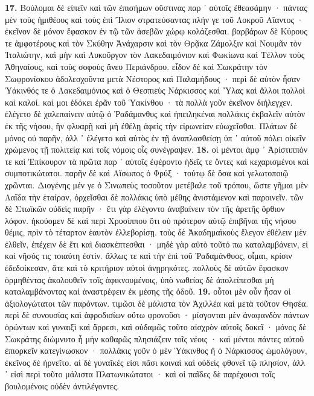 \documentclass[a4paper, 11pt, oneside, polutonikogreek, german]{article}
\begin{document}
\textbf{17.} Βούλομαι δὲ εἰπεῖν καὶ τῶν ἐπισήμων οὕστινας παρ ᾽ αὐτοῖς ἐθεασάμην · πάντας μὲν τοὺς ἡμιθέους καὶ τοὺς ἐπὶ Ἴλιον στρατεύσαντας πλήν γε τοῦ Λοκροῦ Αἴαντος · ἐκεῖνον δὲ μόνον ἔφασκον ἐν τῷ τῶν ἀσεβῶν χώρῳ κολάζεσθαι. βαρβάρων δὲ Κύρους τε ἀμφοτέρους καὶ τὸν Σκύθην Ἀνάχαρσιν καὶ τὸν Θρᾷκα Ζάμολξιν καὶ Νουμᾶν τὸν Ἰταλιώτην, καὶ μὴν καὶ Λυκοῦργον τὸν Λακεδαιμόνιον καὶ Φωκίωνα καὶ Τέλλον τοὺς Ἀθηναίους, καὶ τοὺς σοφοὺς ἄνευ Περιάνδρου. εἶδον δὲ καὶ Σωκράτην τὸν Σωφρονίσκου ἀδολεσχοῦντα μετὰ Νέστορος καὶ Παλαμήδους · περὶ δὲ αὐτὸν ἦσαν Ὑάκινθός τε ὁ Λακεδαιμόνιος καὶ ὁ Θεσπιεὺς Νάρκισσος καὶ Ὕλας καὶ ἄλλοι πολλοὶ καὶ καλοί. καί μοι ἐδόκει ἐρᾶν τοῦ Ὑακίνθου · τὰ πολλὰ γοῦν ἐκεῖνον διήλεγχεν. ἐλέγετο δὲ χαλεπαίνειν αὐτῷ ὁ Ῥαδάμανθυς καὶ ἠπειληκέναι πολλάκις ἐκβαλεῖν αὐτὸν ἐκ τῆς νήσου, ἢν φλυαρῇ καὶ μὴ ἐθέλῃ ἀφεὶς τὴν εἰρωνείαν εὐωχεῖσθαι. Πλάτων δὲ μόνος οὐ παρῆν, ἀλλ ᾽ ἐλέγετο καὶ αὐτὸς ἐν τῇ ἀναπλασθείσῃ ὑπ ᾽ αὐτοῦ πόλει οἰκεῖν χρώμενος τῇ πολιτείᾳ καὶ τοῖς νόμοις οἷς συνέγραψεν. \textbf{18.} οἱ μέντοι ἀμφ ᾽ Ἀρίστιππόν τε καὶ Ἐπίκουρον τὰ πρῶτα παρ ᾽ αὐτοῖς ἐφέροντο ἡδεῖς τε ὄντες καὶ κεχαρισμένοι καὶ συμποτικώτατοι. παρῆν δὲ καὶ Αἴσωπος ὁ Φρύξ · τούτῳ δὲ ὅσα καὶ γελωτοποιῷ χρῶνται. Διογένης μέν γε ὁ Σινωπεὺς τοσοῦτον μετέβαλε τοῦ τρόπου, ὥστε γῆμαι μὲν Λαΐδα τὴν ἑταίραν, ὀρχεῖσθαι δὲ πολλάκις ὑπὸ μέθης ἀνιστάμενον καὶ παροινεῖν. τῶν δὲ Στωϊκῶν οὐδεὶς παρῆν · ἔτι γὰρ ἐλέγοντο ἀναβαίνειν τὸν τῆς ἀρετῆς ὄρθιον λόφον. ἠκούομεν δὲ καὶ περὶ Χρυσίππου ὅτι οὐ πρότερον αὐτῷ ἐπιβῆναι τῆς νήσου θέμις, πρὶν τὸ τέταρτον ἑαυτὸν ἐλλεβορίσῃ. τοὺς δὲ Ἀκαδημαϊκοὺς ἔλεγον ἐθέλειν μὲν ἐλθεῖν, ἐπέχειν δὲ ἔτι καὶ διασκέπτεσθαι · μηδὲ γὰρ αὐτὸ τοῦτό πω καταλαμβάνειν, εἰ καὶ νῆσός τις τοιαύτη ἐστίν. ἄλλως τε καὶ τὴν ἐπὶ τοῦ Ῥαδαμάνθυος, οἶμαι, κρίσιν ἐδεδοίκεσαν, ἅτε καὶ τὸ κριτήριον αὐτοὶ ἀνῃρηκότες. πολλοὺς δὲ αὐτῶν ἔφασκον ὁρμηθέντας ἀκολουθεῖν τοῖς ἀφικνουμένοις, ὑπὸ νωθείας δὲ ἀπολείπεσθαι μὴ καταλαμβάνοντας καὶ ἀναστρέφειν ἐκ μέσης τῆς ὁδοῦ. \textbf{19.} οὗτοι μὲν οὖν ἦσαν οἱ ἀξιολογώτατοι τῶν παρόντων. τιμῶσι δὲ μάλιστα τὸν Ἀχιλλέα καὶ μετὰ τοῦτον Θησέα. περὶ δὲ συνουσίας καὶ ἀφροδισίων οὕτω φρονοῦσι · μίσγονται μὲν ἀναφανδὸν πάντων ὁρώντων καὶ γυναιξὶ καὶ ἄρρεσι, καὶ οὐδαμῶς τοῦτο αἰσχρὸν αὐτοῖς δοκεῖ · μόνος δὲ Σωκράτης διώμνυτο ἦ μὴν καθαρῶς πλησιάζειν τοῖς νέοις · καὶ μέντοι πάντες αὐτοῦ ἐπιορκεῖν κατεγίνωσκον · πολλάκις γοῦν ὁ μὲν Ὑάκινθος ἢ ὁ Νάρκισσος ὡμολόγουν, ἐκεῖνος δὲ ἠρνεῖτο. αἱ δὲ γυναῖκές εἰσι πᾶσι κοιναὶ καὶ οὐδεὶς φθονεῖ τῷ πλησίον, ἀλλ ᾽ εἰσὶ περὶ τοῦτο μάλιστα Πλατωνικώτατοι · καὶ οἱ παῖδες δὲ παρέχουσι τοῖς βουλομένοις οὐδὲν ἀντιλέγοντες.
\end{document}
